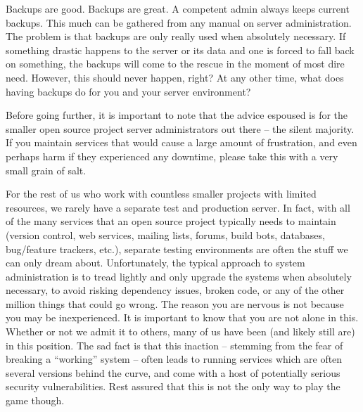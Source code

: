 

Backups are good. Backups are great. A competent admin always keeps current
backups.  This much can be gathered from any manual on server administration.
The problem is that backups are only really used when absolutely necessary.
If something drastic happens to the server or its data and one is forced to fall
back on something, the backups will come to the rescue in the moment of most
dire need. However, this should never happen, right? At any other time, what does
having backups do for you and your server environment?

Before going further, it is important to note that the advice espoused is for
the smaller open source project server administrators out there -- the silent
majority. If you maintain services that would cause a large amount of
frustration, and even perhaps harm if they experienced any downtime, please take
this with a very small grain of salt.

For the rest of us who work with countless smaller projects with limited
resources, we rarely have a separate test and production server. In fact, with
all of the many services that an open source project typically needs to maintain
(version control, web services, mailing lists, forums, build bots, databases,
bug/feature trackers, etc.), separate testing environments are often the stuff
we can only dream about. Unfortunately, the typical approach to system
administration is to tread lightly and only upgrade the systems when absolutely
necessary, to avoid risking dependency issues, broken code, or any of the other
million things that could go wrong. The reason you are nervous is not because
you may be inexperienced. It is important to know that you are not alone in
this. Whether or not we admit it to others, many of us have been (and likely
still are) in this position. The sad fact is that this inaction -- stemming from
the fear of breaking a ``working'' system -- often leads to running services which 
are often several versions behind the curve, and come with a host of potentially
serious security vulnerabilities. Rest assured that this is not the only way to play
the game though.

